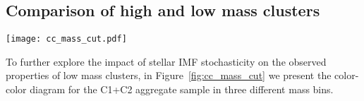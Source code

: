\documentclass[linenumbers]{aastex63}
\begin{document}
\subsection{Comparison of high and low mass clusters}\label{ssect:cc_mag_m_star}
%
\begin{figure*} 
\texttt{[image: cc\_mass\_cut.pdf]}
 \caption{Color-color diagram of ML classified class 1 and 2 clusters in three bins of stellar mass. The most massive clusters with ${\rm M_{*} > 10^4 M_{\odot}}$ are shown in the left panel, intermediate masses of ${\rm 5\times10^3 M_{\odot} > M_{*} < 10^4 M_{\odot}}$ are in the middle panel, and low mass clusters of ${\rm M_{*} < 5\times10^3 M_{\odot}}$ are in the right panel. Similar to Figure\,\ref{fig:cc_compare}, we use a density heat map to illustrate the distribution of clusters.}
 \label{fig:cc_mass_cut}
\end{figure*}
%

To further explore the impact of stellar IMF stochasticity on the observed properties of low mass clusters, in Figure~\ref{fig:cc_mass_cut} we present the color-color diagram for the C1+C2 aggregate sample in three different mass bins.
\end{document}
